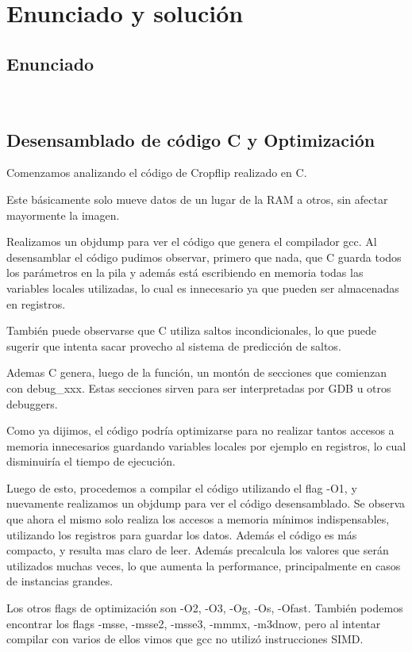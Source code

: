 \documentclass[a4paper]{article}
\begin{document}
\section{Enunciado y solución} 

\subsection{Enunciado}


\
\newpage

\subsection{Desensamblado de código C y Optimización}

Comenzamos analizando el código de Cropflip realizado en C.

Este básicamente solo mueve datos de un lugar de la RAM a otros, sin afectar mayormente la imagen.

Realizamos un objdump para ver el código que genera el compilador gcc. Al desensamblar el código pudimos observar, primero que nada, que C guarda todos los parámetros en la pila y además está escribiendo en memoria todas las variables locales utilizadas, lo cual es innecesario ya que pueden ser almacenadas en registros.

También puede observarse que C utiliza saltos incondicionales, lo que puede sugerir que intenta sacar provecho al sistema de predicción de saltos.

Ademas C genera, luego de la función, un montón de secciones que comienzan con debug_xxx. Estas secciones sirven para ser interpretadas por GDB u otros debuggers.

Como ya dijimos, el código podría optimizarse para no realizar tantos accesos a memoria innecesarios guardando variables locales por ejemplo en registros, lo cual disminuiría el tiempo de ejecución.

Luego de esto, procedemos a compilar el código utilizando el flag -O1, y nuevamente realizamos un objdump para ver el código desensamblado. Se observa que ahora el mismo solo realiza los accesos a memoria mínimos indispensables, utilizando los registros para guardar los datos. Además el código es más compacto, y resulta mas claro de leer. Además precalcula los valores que serán utilizados muchas veces, lo que aumenta la performance, principalmente en casos de instancias grandes.

Los otros flags de optimización son -O2, -O3, -Og, -Os, -Ofast. También podemos encontrar los flags -msse, -msse2, -msse3, -mmmx, -m3dnow, pero al intentar compilar con varios de ellos vimos que gcc no utilizó instrucciones SIMD.
\end{document}
